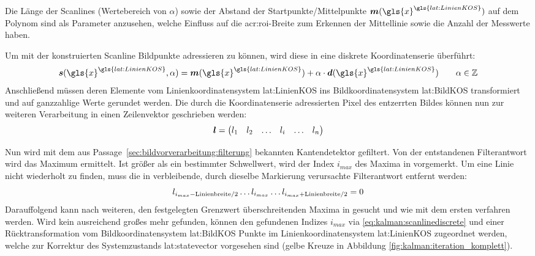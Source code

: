 Die Länge der Scanlines (Wertebereich von \(\alpha\)) sowie der Abstand der Startpunkte/Mittelpunkte \(\vct{m}(\gls{x}^{\gls{lat:LinienKOS}})\) auf dem Polynom sind als Parameter anzusehen, welche Einfluss auf die \gls{acr:roi}-Breite zum Erkennen der Mittellinie sowie die Anzahl der Messwerte haben.

Um mit der konstruierten Scanline Bildpunkte adressieren zu können, wird diese in eine diskrete Koordinatenserie überführt:
\begin{equation}
\label{eq:kalman:scanlinediscrete}
\vct{s}(\gls{x}^{\gls{lat:LinienKOS}},\alpha) =
\vct{m}(\gls{x}^{\gls{lat:LinienKOS}})
  + \alpha \cdot \vct{d}(\gls{x}^{\gls{lat:LinienKOS}})
\qquad \alpha \in \mathbb{Z}
\end{equation}
Anschließend müssen deren Elemente vom Linienkoordinatensystem \gls{lat:LinienKOS} ins Bildkoordinatensystem \gls{lat:BildKOS} transformiert und auf ganzzahlige Werte gerundet werden.
Die durch die Koordinatenserie adressierten Pixel des entzerrten Bildes können nun zur weiteren Verarbeitung in einen Zeilenvektor  geschrieben werden: 
 \begin{equation}
 \boldsymbol{l} =
 \begin{pmatrix}
 l_1 & l_2 & \dots & l_i & \dots & l_n
 \end{pmatrix}
 \end{equation}
 
Nun wird  mit dem aus Passage~\ref{sec:bildvorverarbeitung:filterung} bekannten Kantendetektor gefiltert. Von der entstandenen Filterantwort  wird das Maximum  ermittelt. Ist  größer als ein bestimmter Schwellwert, wird der Index \begin{math} i_{max} \end{math} des Maxima in  vorgemerkt. Um eine Linie nicht wiederholt zu finden, muss die in  verbleibende, durch dieselbe Markierung verursachte Filterantwort entfernt werden:
\begin{equation}
\label{eq:kalman:scanlines:deletefiltresponse}
l_{i_{max}-\text{Linienbreite}/2} \dots l_{i_{max}} 
 \dots  l_{i_{max}+\text{Linienbreite}/2} = 0
 \end{equation}
Darauffolgend kann nach weiteren, den festgelegten Grenzwert überschreitenden Maxima in  gesucht und wie mit dem ersten  verfahren werden.
Wird kein ausreichend großes  mehr gefunden, können den gefundenen Indizes \begin{math} i_{max} \end{math} via \eqref{eq:kalman:scanlinediscrete} und einer Rücktransformation vom Bildkoordinatensystem \gls{lat:BildKOS} Punkte  im Linienkoordinatensystem \gls{lat:LinienKOS} zugeordnet werden, welche zur Korrektur des Systemzustands \gls{lat:statevector} vorgesehen sind (gelbe Kreuze in Abbildung \ref{fig:kalman:iteration_komplett}).

